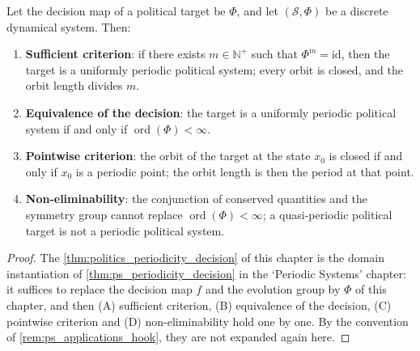 \begin{theorem}\label{thm:politics_periodicity_decision}
Let the decision map of a political target be $\Phi$, and let $(\mathcal S,\Phi)$ be a discrete dynamical system. Then:
\begin{enumerate}[label=(\Alph*)]
    \item \textbf{Sufficient criterion}: if there exists $m\in\mathbb N^+$ such that $\Phi^m=\mathrm{id}$, then the target is a uniformly periodic political system; every orbit is closed, and the orbit length divides $m$.
    \item \textbf{Equivalence of the decision}: the target is a uniformly periodic political system if and only if $\operatorname{ord}(\Phi)<\infty$.
    \item \textbf{Pointwise criterion}: the orbit of the target at the state $x_0$ is closed if and only if $x_0$ is a periodic point; the orbit length is then the period at that point.
    \item \textbf{Non-eliminability}: the conjunction of conserved quantities and the symmetry group cannot replace $\operatorname{ord}(\Phi)<\infty$; a quasi-periodic political target is not a periodic political system.
\end{enumerate}
\end{theorem}

\begin{proof}
The \cref{thm:politics_periodicity_decision} of this chapter is the domain instantiation of \cref{thm:ps_periodicity_decision} in the `Periodic Systems' chapter:
it suffices to replace the decision map $f$ and the evolution group by $\Phi$ of this chapter, and then (A) sufficient criterion, (B) equivalence of the decision, (C) pointwise criterion and
(D) non-eliminability hold one by one. By the convention of \cref{rem:ps_applications_hook}, they are not expanded again here.
\end{proof}

